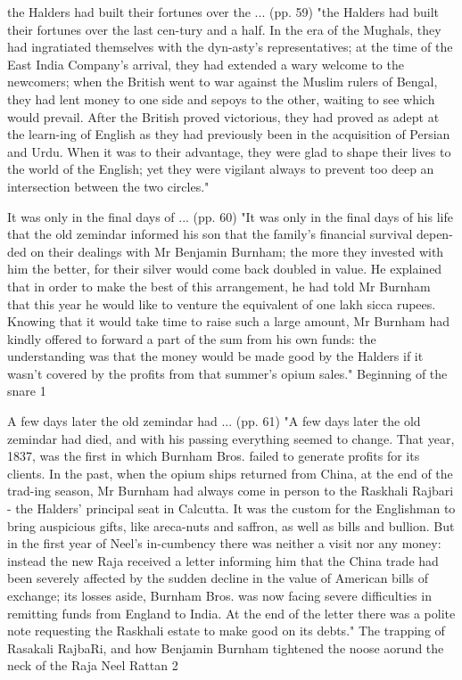 the Halders had built their fortunes over the ... (pp. 59)
"the Halders had built their fortunes over the last cen-tury and a half. In the era of the Mughals, they had ingratiated themselves with the dyn-asty’s representatives; at the time of the East India Company’s arrival, they had extended a wary welcome to the newcomers; when the British went to war against the Muslim rulers of Bengal, they had lent money to one side and sepoys to the other, waiting to see which would prevail. After the British proved victorious, they had proved as adept at the learn-ing of English as they had previously been in the acquisition of Persian and Urdu. When it was to their advantage, they were glad to shape their lives to the world of the English; yet they were vigilant always to prevent too deep an intersection between the two circles."

It was only in the final days of ... (pp. 60)
"It was only in the final days of his life that the old zemindar informed his son that the family’s financial survival depen-ded on their dealings with Mr Benjamin Burnham; the more they invested with him the better, for their silver would come back doubled in value. He explained that in order to make the best of this arrangement, he had told Mr Burnham that this year he would like to venture the equivalent of one lakh sicca rupees. Knowing that it would take time to raise such a large amount, Mr Burnham had kindly offered to forward a part of the sum from his own funds: the understanding was that the money would be made good by the Halders if it wasn’t covered by the profits from that summer’s opium sales."
Beginning of the snare 1

A few days later the old zemindar had ... (pp. 61)
"A few days later the old zemindar had died, and with his passing everything seemed to change. That year, 1837, was the first in which Burnham Bros. failed to generate profits for its clients. In the past, when the opium ships returned from China, at the end of the trad-ing season, Mr Burnham had always come in person to the Raskhali Rajbari - the Halders’ principal seat in Calcutta. It was the custom for the Englishman to bring auspicious gifts, like areca-nuts and saffron, as well as bills and bullion. But in the first year of Neel’s in-cumbency there was neither a visit nor any money: instead the new Raja received a letter informing him that the China trade had been severely affected by the sudden decline in the value of American bills of exchange; its losses aside, Burnham Bros. was now facing severe difficulties in remitting funds from England to India. At the end of the letter there was a polite note requesting the Raskhali estate to make good on its debts."
The trapping of Rasakali RajbaRi, and how Benjamin Burnham tightened the noose aorund the neck of the Raja Neel Rattan 2

